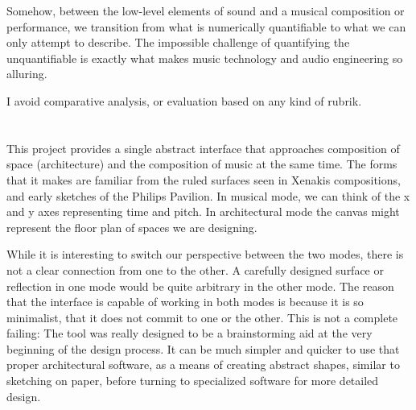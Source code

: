 Somehow, between the low-level elements of sound and a musical
composition or performance, we transition from what is numerically
quantifiable to what we can only attempt to describe. The impossible
challenge of quantifying the unquantifiable is exactly what makes
music technology and audio engineering so alluring.

 I avoid comparative analysis, or
evaluation based on any kind of rubrik. 


\section{}
This project provides a single abstract interface that approaches
composition of space (architecture) and the composition of music at
the same time. The forms that it makes are familiar from the ruled
surfaces seen in Xenakis compositions, and early sketches of the
Philips Pavilion. In musical mode, we can think of the x and y axes
representing time and pitch. In architectural mode the canvas might
represent the floor plan of spaces we are designing.

While it is interesting to switch our perspective between the two
modes, there is not a clear connection from one to the other. A
carefully designed surface or reflection in one mode would be quite
arbitrary in the other mode. The reason that the interface is capable
of working in both modes is because it is so minimalist, that it does
not commit to one or the other. This is not a complete failing: The
tool was really designed to be a brainstorming aid at the very
beginning of the design process. It can be much simpler and quicker to
use that proper architectural software, as a means of creating
abstract shapes, similar to sketching on paper, before turning to
specialized software for more detailed design.


